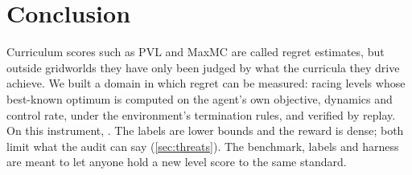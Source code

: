 \section{Conclusion}
\label{sec:conclusion}

Curriculum scores such as PVL and MaxMC are called regret estimates, but outside
gridworlds they have only been judged by what the curricula they drive achieve. We built a
domain in which regret can be measured: racing levels whose best-known optimum is computed on the agent's own objective,
dynamics and control rate, under the environment's termination rules, and verified by
replay. On this instrument,
.
The labels are lower bounds and the reward is dense; both limit what the audit can say
(\cref{sec:threats}). The benchmark, labels and harness are meant to let anyone hold a new
level score to the same standard.
